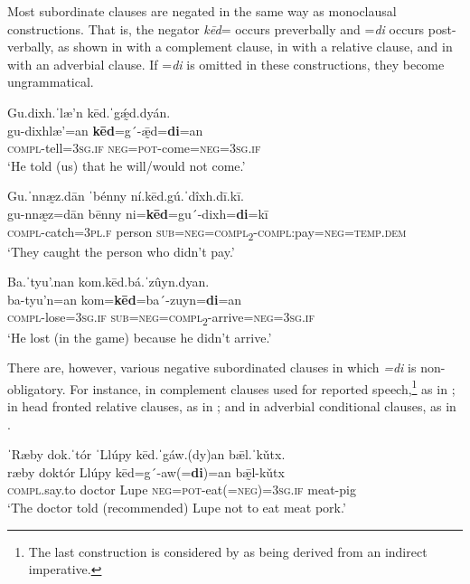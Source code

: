 \documentclass[output=paper,colorlinks=true, citecolor=brown]{langscibook}
\begin{document}
Most subordinate clauses are negated in the same way as monoclausal constructions. That is, the negator \textit{kēd}= occurs preverbally and =\textit{di} occurs post-verbally, as shown in  with a complement clause, in  with a relative clause, and in  with an adverbial clause. If =\textit{di} is omitted in these constructions, they become ungrammatical.


\ea\label{ex:zap:52} 
    \glll Gu.dixh.ˈlæ’n kēd.ˈgǽ̰d.dyán.\\ 
               gu-dixhlæ’=an \textbf{kēd}=g´-ǣ̰d=\textbf{di}=an\\
              \textsc{compl}{}-tell=\textsc{3sg.if} \textsc{neg}=\textsc{pot}{}-come=\textsc{neg}=\textsc{3sg.if}\\
        \glt  ‘He told (us) that he will/would not come.’\\
    \glt 
\z 

\ea\label{ex:zap:53} 
        \glll Gu.ˈnnæ̰z.dān ˈbénny ní.kēd.gú.ˈdîxh.dī.kī.\\ 
              gu-nnæ̰z=dān bēnny ni=\textbf{kēd}=gu´-dixh=\textbf{di}=kī\\
              \textsc{compl}{}-catch=\textsc{3pl.f} person \textsc{sub}=\textsc{neg}=\textsc{compl}\textsc{\textsubscript{2}}\textsc{{}-compl}:pay=\textsc{neg}=\textsc{temp.dem}\\
        \glt ‘They caught the person who didn’t pay.’
\z 

\ea\label{ex:zap:54} 
        \glll Ba.ˈtyu’.nan kom.kēd.bá.ˈzûyn.dyan.\\ 
              ba-tyu’n=an kom=\textbf{kēd}=ba´-zuyn=\textbf{di}=an\\
              \textsc{compl}{}-lose=\textsc{3sg.if} \textsc{sub}=\textsc{neg}=\textsc{compl}\textsc{\textsubscript{2}}{}-arrive=\textsc{neg}=\textsc{3sg.if}\\
        \glt ‘He lost (in the game) because he didn’t arrive.'
\z 

There are, however, various negative subordinated clauses in which \textit{=di} is non-obligatory. For instance, in complement clauses used for reported speech,\footnote{The last construction is considered by \citet{Lee1999} as being derived from an indirect imperative.} as in ; in head fronted relative clauses, as in ; and in adverbial conditional clauses, as in .

\ea\label{ex:zap:55} 
    \glll ˈRæby dok.ˈtór ˈLlúpy kēd.ˈgáw.(dy)an bǣl.ˈkǔtx.\\ 
          ræby doktór Llúpy kēd=g´-aw(=\textbf{di})=an bǣ̰l-kǔtx\\
          \textsc{compl}.say.to doctor Lupe \textsc{neg}=\textsc{pot}{}-eat(=\textsc{neg})=\textsc{3sg.if} meat-pig\\
    \glt ‘The doctor told (recommended) Lupe not to eat meat pork.’
\z 
\end{document}
